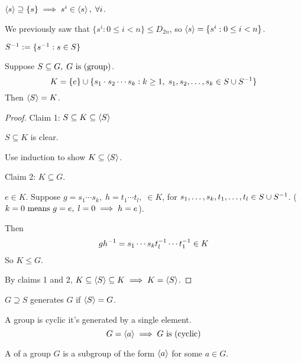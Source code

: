 \documentclass[12pt]{article}
\begin{document}
\bboxexam
\begin{exam}
  \(\left\langle s\right\rangle\supseteq\{s\}\implies s^i\in\left\langle s\right\rangle,\;\forall i\).

  We previously saw that \(\{s^i:0\le i< n\}\le D_{2n}\), so
  \(\left\langle s\right\rangle=\{s^i:0\le i<n\}\).
\end{exam}
\ebox

\bboxnota
\begin{nota}
  \(S^{-1}:=\{s^{-1}:s\in S\}\)
\end{nota}
\ebox

\bboxprop
\begin{prop}
  Suppose \(S\subseteq G,\;G\ \mathrm{is}\ (\mathrm{group})\).
  \[K=\{e\}\cup\{s_1\cdot s_2\cdots s_k:k\ge 1,\;s_1,s_2,\dots,s_k
  \in S\cup S^{-1}\}\]
  Then \(\left\langle S\right\rangle=K\).
\end{prop}
\ebox

\bboxproof
\begin{proof}[Proof]
  Claim 1: \(S\subseteq K\subseteq\left\langle S\right\rangle\)

  \(S\subseteq K\) is clear.

  Use induction to show \(K\subseteq\left\langle S\right\rangle\).

  Claim 2: \(K\subseteq G\).

  \(e\in K\). Suppose \(g=s_1\cdots s_k,\;h=t_1\cdots t_l,\;\in K\), for
  \(s_1,\dots,s_k,t_1,\dots,t_l\in S\cup S^{-1}\). (\(k=0\text{ means }g=e,\;
  l=0\implies h=e\)).

  Then
  \[gh^{-1}=s_1\cdots s_kt^{-1}_l\cdots t^{-1}_1\in K\]
  So \(K\le G\).

  By claims 1 and 2, \(K\subseteq\left\langle S\right\rangle\subseteq K\implies K=\left\langle S\right\rangle\).
\end{proof}
\ebox

\bboxlem
\begin{lem}
  \(G\supseteq S\) generates \(G\) if \(\left\langle S\right\rangle=G\).
\end{lem}
\ebox

\bboxdefn
\begin{defn}
  A group is cyclic  it's generated by a single element.
  \[G=\left\langle a\right\rangle\implies G\ \mathrm{is}\ (\mathrm{cyclic})\]
\end{defn}
\ebox

\bboxdefn
\begin{defn}
  A  of a group \(G\) is a subgroup of the form
  \(\left\langle a\right\rangle\) for some \(a\in G\).
\end{defn}
\ebox
\end{document}
